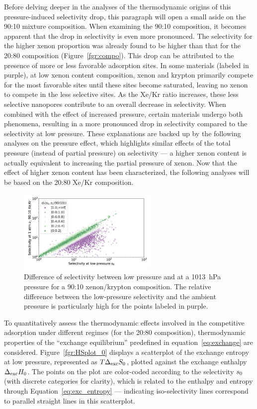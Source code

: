 \documentclass[main.tex]{subfiles}
\begin{document}
Before delving deeper in the analyses of the thermodynamic origins of this pressure-induced selectivity drop, this paragraph will open a small aside on the 90:10 mixture composition.
When examining the 90:10 composition, it becomes apparent that the drop in selectivity is even more pronounced. The selectivity for the higher xenon proportion was already found to be higher than that for the 20:80 composition (Figure~\ref{fgr:compo}). This drop can be attributed to the presence of more or less favorable adsorption sites. In some materials (labeled in purple), at low xenon content composition, xenon and krypton primarily compete for the most favorable sites until these sites become saturated, leaving no xenon to compete in the less selective sites. As the Xe/Kr ratio increases, these less selective nanopores contribute to an overall decrease in selectivity. When combined with the effect of increased pressure, certain materials undergo both phenomena, resulting in a more pronounced drop in selectivity compared to the selectivity at low pressure. These explanations are backed up by the following analyses on the pressure effect, which highlights similar effects of the total pressure (instead of partial pressure) on selectivity --- a higher xenon content is actually equivalent to increasing the partial pressure of xenon. Now that the effect of higher xenon content has been characterized, the following analyses will be based on the 20:80 Xe/Kr composition.

\begin{figure}[t]
  \centering
    \includegraphics[width=0.6\textwidth]{figures/2-thermo/s_0_vs_s_9010_overview_log.jpg}
    \caption{Difference of selectivity between low pressure and at a \SI{1013}{\hecto\pascal} pressure for a 90:10 xenon/krypton composition. The relative difference between the low-pressure selectivity and the ambient pressure is particularly high for the points labeled in purple.}\label{fgr:overview_9010}
\end{figure}

To quantitatively assess the thermodynamic effects involved in the competitive adsorption under different regimes (for the 20:80 composition), thermodynamic properties of the ``exchange equilibrium'' predefined in equation~\ref{eq:exchange} are considered. Figure~\ref{fgr:HSplot_0} displays a scatterplot of the exchange entropy at low pressure, represented as $T\Delta_{\text{exc}}S_{\text{0}}$, plotted against the exchange enthalpy $\Delta_{\text{exc}}H_{\text{0}}$. The points on the plot are color-coded according to the selectivity $s_{\text{0}}$ (with discrete categories for clarity), which is related to the enthalpy and entropy through Equation~\ref{eq:exc_entropy} --- indicating iso-selectivity lines correspond to parallel straight lines in this scatterplot.
  
\end{document}
